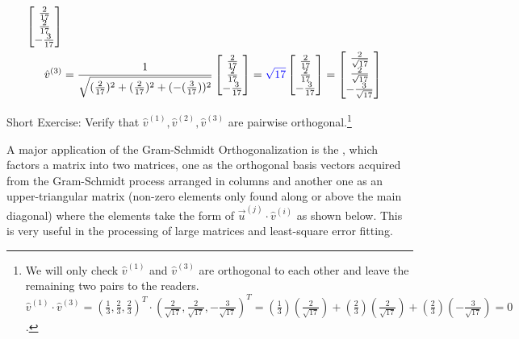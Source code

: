 \begin{solution}
\begin{align*}
\begin{bmatrix}
\frac{2}{17} \\
\frac{2}{17} \\
-\frac{3}{17}
\end{bmatrix}
\\
\hat{v}^{(3)} &= \frac{1}{\sqrt{(\frac{2}{17})^2 + (\frac{2}{17})^2 + (-(\frac{3}{17}))^2}}
\begin{bmatrix}
\frac{2}{17} \\
\frac{2}{17} \\
-\frac{3}{17}
\end{bmatrix}
=
\textcolor{blue}{\sqrt{17}}
\begin{bmatrix}
\frac{2}{17} \\
\frac{2}{17} \\
-\frac{3}{17}
\end{bmatrix}
=
\begin{bmatrix}
\frac{2}{\sqrt{17}} \\
\frac{2}{\sqrt{17}} \\
-\frac{3}{\sqrt{17}}
\end{bmatrix}
\end{align*}
\end{solution}
Short Exercise: Verify that $\hat{v}^{(1)}, \hat{v}^{(2)}, \hat{v}^{(3)}$ are pairwise orthogonal.\footnote{We will only check $\hat{v}^{(1)}$ and $\hat{v}^{(3)}$ are orthogonal to each other and leave the remaining two pairs to the readers. $\hat{v}^{(1)} \cdot \hat{v}^{(3)} = (\frac{1}{3}, \frac{2}{3}, \frac{2}{3})^T \cdot (\frac{2}{\sqrt{17}}, \frac{2}{\sqrt{17}}, -\frac{3}{\sqrt{17}})^T = (\frac{1}{3})(\frac{2}{\sqrt{17}}) + (\frac{2}{3})(\frac{2}{\sqrt{17}}) + (\frac{2}{3})(-\frac{3}{\sqrt{17}}) = 0$.} \par
A major application of the Gram-Schmidt Orthogonalization is the , which factors a matrix into two matrices, one as the orthogonal basis vectors acquired from the Gram-Schmidt process arranged in columns and another one as an upper-triangular matrix (non-zero elements only found along or above the main diagonal) where the elements take the form of $\vec{u}^{(j)} \cdot \hat{v}^{(i)}$ as shown below. This is very useful in the processing of large matrices and least-square error fitting.
